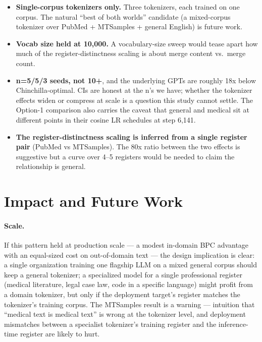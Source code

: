 \documentclass[11pt]{article}
\begin{document}
\begin{itemize}[leftmargin=*, itemsep=0pt]
    \item \textbf{Single-corpus tokenizers only.} Three tokenizers, each trained on one corpus. The natural ``best of both worlds'' candidate (a mixed-corpus tokenizer over PubMed + MTSamples + general English) is future work.
    \item \textbf{Vocab size held at 10{,}000.} A vocabulary-size sweep would tease apart how much of the register-distinctness scaling is about merge content vs.\ merge count.
    \item \textbf{n=5/5/3 seeds, not 10+}, and the underlying GPTs are roughly 18x below Chinchilla-optimal. CIs are honest at the n's we have; whether the tokenizer effects widen or compress at scale is a question this study cannot settle. The Option-1 comparison also carries the caveat that general and medical sit at different points in their cosine LR schedules at step 6{,}141.
    \item \textbf{The register-distinctness scaling is inferred from a single register pair} (PubMed vs MTSamples). The 80x ratio between the two effects is suggestive but a curve over 4--5 registers would be needed to claim the relationship is general.
\end{itemize}

\section{Impact and Future Work} \label{sec:future}

\paragraph{Scale.}
If this pattern held at production scale --- a modest in-domain BPC advantage with an equal-sized cost on out-of-domain text --- the design implication is clear: a single organization training one flagship LLM on a mixed general corpus should keep a general tokenizer; a specialized model for a single professional register (medical literature, legal case law, code in a specific language) might profit from a domain tokenizer, but only if the deployment target's register matches the tokenizer's training corpus. The MTSamples result is a warning --- intuition that ``medical text is medical text'' is wrong at the tokenizer level, and deployment mismatches between a specialist tokenizer's training register and the inference-time register are likely to hurt.
\end{document}
